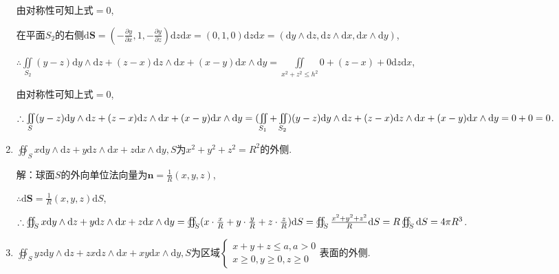 \documentclass[12pt,UTF8,fleqn]{ctexart}
\newcommand{\varIInt}[4]{\iint\limits_{#1}#2\mathrm d#3\mathrm d#4}
\newcommand{\md}[1]{\mathrm d#1}
\newcommand{\BSIInt}[2]{\iint\limits_{#1}#2}
\newcommand{\pp}[2]{\frac{\partial #1}{\partial #2}}
\newcommand{\BSOIInt}[2]{\oiint\nolimits_{#1}#2}
\begin{document}
\begin{enumerate}
由对称性可知上式$=0$,

在平面$S_2$的右侧$\md\bm S=(-\pp yx,1,-\pp yz)\md z\md x=(0,1,0)\md z\md x=(\md y\wedge\md z,\md z\wedge\md x,\md x\wedge\md y)$,

$\therefore\BSIInt{S_2}{(y-z)\md y\wedge\md z+(z-x)\md z\wedge\md x+(x-y)\md x\wedge\md y}=\varIInt{x^2+z^2\leqslant h^2}{0+(z-x)+0}zx$,

由对称性可知上式$=0$,

$\therefore\BSIInt S{(y-z)\md y\wedge\md z+(z-x)\md z\wedge\md x+(x-y)\md x\wedge\md y}\\
=(\BSIInt{S_1}+\BSIInt{S_2}{)(y-z)\md y\wedge\md z+(z-x)\md z\wedge\md x+(x-y)\md x\wedge\md y}\\
=0+0=0$.

\item$\BSOIInt S{x\md y\wedge\md z+y\md z\wedge\md x+z\md x\wedge\md y},S$为$x^2+y^2+z^2=R^2$的外侧.

解：球面$S$的外向单位法向量为$\bm n=\frac1R(x,y,z)$,

$\therefore\md\bm S=\frac1R(x,y,z)\md S$,

$\therefore\BSOIInt S{x\md y\wedge\md z+y\md z\wedge\md x+z\md x\wedge\md y}=\BSOIInt S{(x\cdot\frac xR+y\cdot\frac yR+z\cdot\frac zR)\md S}=\BSOIInt S{\frac{x^2+y^2+z^2}R\md S}\\
=R\BSOIInt S\md S=4\pi R^3$.

\item$\BSOIInt S{yz\md y\wedge\md z+zx\md z\wedge\md x+xy\md x\wedge\md y},S$为区域$\begin{cases}
x+y+z\leqslant a,a>0\\
x\geqslant0,y\geqslant0,z\geqslant0
\end{cases}$表面的外侧.


\end{enumerate}
\end{document}
